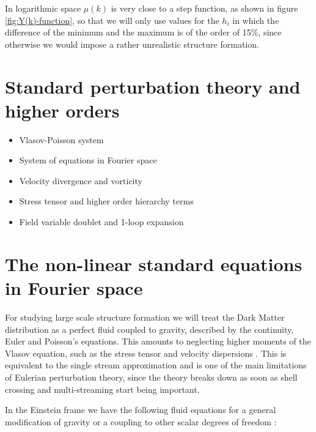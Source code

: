 In logarithmic space $\mu(k)$ is very close to a step function, as
shown in figure \ref{fig:Y(k)-function}, so that we will only use
values for the $h_{i}$ in which the difference of the minimum and
the maximum is of the order of 15\%, since otherwise we would impose
a rather unrealistic structure formation.


\section{Standard perturbation theory and higher orders}
\begin{itemize}
\item Vlasov-Poisson system
\item System of equations in Fourier space
\item Velocity divergence and vorticity
\item Stress tensor and higher order hierarchy terms
\item Field variable doublet and 1-loop expansion
\end{itemize}



\section{The non-linear standard equations in Fourier space}

For studying large scale structure formation we will treat the Dark
Matter distribution as a perfect fluid coupled to gravity, described
by the continuity, Euler and Poisson's equations. This amounts to
neglecting higher moments of the Vlasov equation, such as the stress
tensor and velocity dispersions \cite{bernardeau_large-scale_2001}.
This is equivalent to the single stream approximation and is one of
the main limitations of Eulerian perturbation theory, since the theory
breaks down as soon as shell crossing and multi-streaming start being
important.

In the Einstein frame we have the following fluid equations for a
general modification of gravity or a coupling to other scalar degrees
of freedom \cite{pietroni_flowing_2008}:

